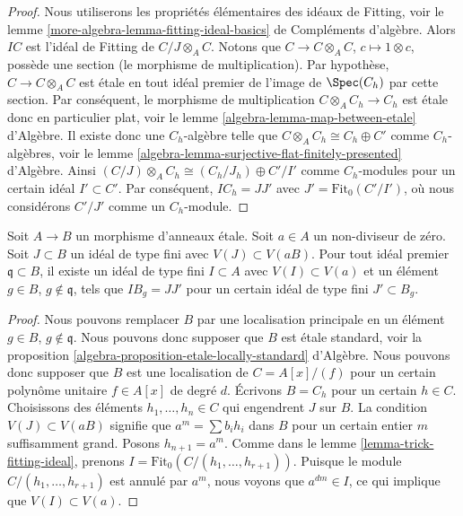 \begin{proof}
Nous utiliserons les propriétés élémentaires des idéaux de Fitting, voir le
lemme \ref{more-algebra-lemma-fitting-ideal-basics} de Compléments d'algèbre.
Alors $IC$ est l'idéal de Fitting de $C/J \otimes_A C$.
Notons que $C \to C \otimes_A C$, $c \mapsto 1 \otimes c$, possède une section
(le morphisme de multiplication). Par hypothèse, $C \to C \otimes_A C$ est \'etale
en tout idéal premier de l'image de $\Spec(C_h)$ par cette section.
Par conséquent, le morphisme de multiplication $C \otimes_A C_h \to C_h$ est \'etale
donc en particulier plat, voir le lemme \ref{algebra-lemma-map-between-etale} d'Algèbre.
Il existe donc une $C_h$-algèbre telle que
$C \otimes_A C_h \cong C_h \oplus C'$ comme $C_h$-algèbres, voir le
lemme \ref{algebra-lemma-surjective-flat-finitely-presented} d'Algèbre.
Ainsi $(C/J) \otimes_A C_h \cong (C_h/J_h) \oplus C'/I'$ comme
$C_h$-modules pour un certain idéal $I' \subset C'$.
Par conséquent, $IC_h = JJ'$ avec $J' = \text{Fit}_0(C'/I')$, où nous considérons
$C'/J'$ comme un $C_h$-module.
\end{proof}

\begin{lemma}
\label{lemma-push-ideal}
Soit $A \to B$ un morphisme d'anneaux \'etale. Soit $a \in A$ un non-diviseur de zéro.
Soit $J \subset B$ un idéal de type fini avec $V(J) \subset V(aB)$.
Pour tout idéal premier $\mathfrak q \subset B$, il existe un idéal de type fini
$I \subset A$ avec $V(I) \subset V(a)$ et un élément
$g \in B$, $g \not \in \mathfrak q$, tels que
$IB_g = JJ'$ pour un certain idéal de type fini $J' \subset B_g$.
\end{lemma}

\begin{proof}
Nous pouvons remplacer $B$ par une localisation principale en
un élément $g \in B$, $g \not \in \mathfrak q$. Nous pouvons donc supposer
que $B$ est \'etale standard, voir la
proposition \ref{algebra-proposition-etale-locally-standard} d'Algèbre.
Nous pouvons donc supposer que $B$ est une localisation
de $C = A[x]/(f)$ pour un certain polynôme unitaire $f \in A[x]$ de degré $d$.
Écrivons $B = C_h$ pour un certain $h \in C$. Choisissons des éléments $h_1, \ldots, h_n \in C$
qui engendrent $J$
sur $B$. La condition $V(J) \subset V(aB)$ signifie que
$a^m = \sum b_i h_i$ dans $B$ pour un certain entier $m$ suffisamment grand. Posons $h_{n + 1} = a^m$.
Comme dans le lemme \ref{lemma-trick-fitting-ideal}, prenons
$I = \text{Fit}_0(C/(h_1, \ldots, h_{r + 1}))$.
Puisque le module $C/(h_1, \ldots, h_{r + 1})$
est annulé par $a^m$, nous voyons que $a^{dm} \in I$, ce qui implique
que $V(I) \subset V(a)$.
\end{proof}

